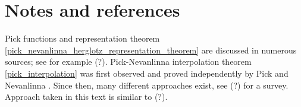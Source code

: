 \section{Notes and references}

Pick functions and representation theorem \ref{pick_nevanlinna_herglotz_representation_theorem} are discussed in numerous sources; see for example (?). Pick-Nevanlinna interpolation theorem \ref{pick_interpolation} was first observed and proved independently by Pick \cite{Pick} and Nevanlinna \cite{Nevan}. Since then, many different approaches exist, see (?) for a survey. Approach taken in this text is similar to (?).
\begin{comment}

TODO:
\begin{itemize}
	\item Examples of representing measures behind functions and functions behind representing measures
	\item Spectral commutant lifting theorem
	\item Use Morera's theorem to prove weak Hindmarsh's theorem
	\item Nice formula for finite Pick extension (rational function case)
\end{itemize}

\end{comment}






